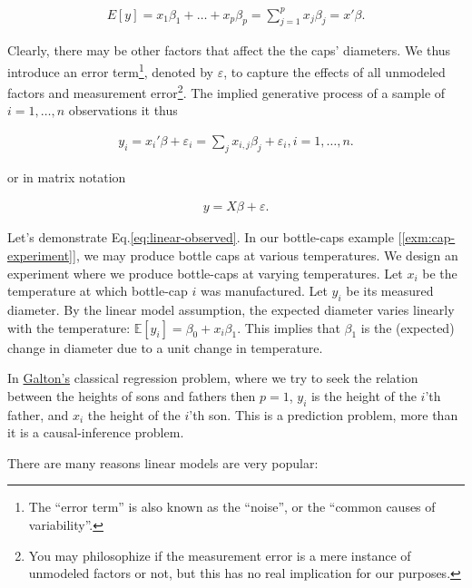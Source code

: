 \documentclass[]{book}
\theoremstyle{definition}
\theoremstyle{definition}
\theoremstyle{definition}
\theoremstyle{remark}
\let\BeginKnitrBlock\begin \let\EndKnitrBlock\end
\begin{document}
\begin{align}
  E[y]=x_1 \beta_1 + \dots + x_p \beta_p = \sum_{j=1}^p x_j \beta_j = x'\beta .
  \label{eq:linear-mean}
\end{align}

Clearly, there may be other factors that affect the the caps' diameters.
We thus introduce an error term\footnote{The ``error term'' is also
  known as the ``noise'', or the ``common causes of variability''.},
denoted by \(\varepsilon\), to capture the effects of all unmodeled
factors and measurement error\footnote{You may philosophize if the
  measurement error is a mere instance of unmodeled factors or not, but
  this has no real implication for our purposes.}. The implied
generative process of a sample of \(i=1,\dots,n\) observations it thus

\begin{align}
  y_i = x_i'\beta + \varepsilon_i = \sum_j x_{i,j} \beta_j + \varepsilon_i , i=1,\dots,n .
  \label{eq:linear-observed}
\end{align}

or in matrix notation

\begin{align}
  y = X \beta + \varepsilon .
  \label{eq:linear-matrix}
\end{align}

Let's demonstrate Eq.\eqref{eq:linear-observed}. In our bottle-caps
example {[}\ref{exm:cap-experiment}{]}, we may produce bottle caps at
various temperatures. We design an experiment where we produce
bottle-caps at varying temperatures. Let \(x_i\) be the temperature at
which bottle-cap \(i\) was manufactured. Let \(y_i\) be its measured
diameter. By the linear model assumption, the expected diameter varies
linearly with the temperature:
\(\mathbb{E}[y_i]=\beta_0 + x_i \beta_1\). This implies that \(\beta_1\)
is the (expected) change in diameter due to a unit change in
temperature.

\BeginKnitrBlock{remark}
{}In
\href{https://en.wikipedia.org/wiki/Regression_toward_the_mean}{Galton's}
classical regression problem, where we try to seek the relation between
the heights of sons and fathers then \(p=1\), \(y_i\) is the height of
the \(i\)'th father, and \(x_i\) the height of the \(i\)'th son. This is
a prediction problem, more than it is a causal-inference problem.
\EndKnitrBlock{remark}

There are many reasons linear models are very popular:
\end{document}
